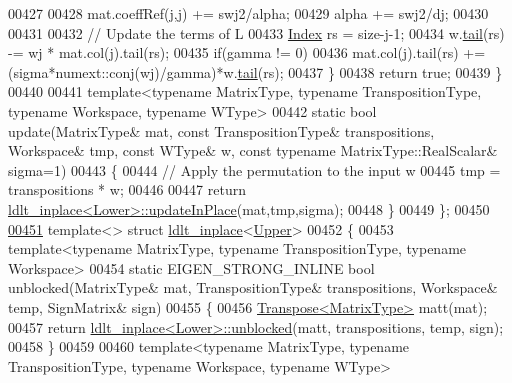\begin{DoxyCode}
00427 
00428       mat.coeffRef(j,j) += swj2/alpha;
00429       alpha += swj2/dj;
00430 
00431 
00432       \textcolor{comment}{// Update the terms of L}
00433       \hyperlink{namespace_eigen_a62e77e0933482dafde8fe197d9a2cfde}{Index} rs = size-j-1;
00434       w.\hyperlink{group___core___module_aec3cf8f4f73c641d21a2c080c3e59662}{tail}(rs) -= wj * mat.col(j).tail(rs);
00435       \textcolor{keywordflow}{if}(gamma != 0)
00436         mat.col(j).tail(rs) += (sigma*numext::conj(wj)/gamma)*w.\hyperlink{group___core___module_aec3cf8f4f73c641d21a2c080c3e59662}{tail}(rs);
00437     \}
00438     \textcolor{keywordflow}{return} \textcolor{keyword}{true};
00439   \}
00440 
00441   \textcolor{keyword}{template}<\textcolor{keyword}{typename} MatrixType, \textcolor{keyword}{typename} TranspositionType, \textcolor{keyword}{typename} Workspace, \textcolor{keyword}{typename} WType>
00442   \textcolor{keyword}{static} \textcolor{keywordtype}{bool} update(MatrixType& mat, \textcolor{keyword}{const} TranspositionType& transpositions, Workspace& tmp, \textcolor{keyword}{const} WType&
       w, \textcolor{keyword}{const} \textcolor{keyword}{typename} MatrixType::RealScalar& sigma=1)
00443   \{
00444     \textcolor{comment}{// Apply the permutation to the input w}
00445     tmp = transpositions * w;
00446 
00447     \textcolor{keywordflow}{return} \hyperlink{struct_eigen_1_1internal_1_1ldlt__inplace}{ldlt\_inplace<Lower>::updateInPlace}(mat,tmp,sigma);
00448   \}
00449 \};
00450 
\hyperlink{struct_eigen_1_1internal_1_1ldlt__inplace_3_01_upper_01_4}{00451} \textcolor{keyword}{template}<> \textcolor{keyword}{struct }\hyperlink{struct_eigen_1_1internal_1_1ldlt__inplace}{ldlt\_inplace}<\hyperlink{group__enums_gga39e3366ff5554d731e7dc8bb642f83cda6bcb58be3b8b8ec84859ce0c5ac0aaec}{Upper}>
00452 \{
00453   \textcolor{keyword}{template}<\textcolor{keyword}{typename} MatrixType, \textcolor{keyword}{typename} TranspositionType, \textcolor{keyword}{typename} Workspace>
00454   \textcolor{keyword}{static} EIGEN\_STRONG\_INLINE \textcolor{keywordtype}{bool} unblocked(MatrixType& mat, TranspositionType& transpositions, Workspace& 
      temp, SignMatrix& sign)
00455   \{
00456     \hyperlink{group___core___module_class_eigen_1_1_transpose}{Transpose<MatrixType>} matt(mat);
00457     \textcolor{keywordflow}{return} \hyperlink{struct_eigen_1_1internal_1_1ldlt__inplace}{ldlt\_inplace<Lower>::unblocked}(matt, transpositions, temp, sign);
00458   \}
00459 
00460   \textcolor{keyword}{template}<\textcolor{keyword}{typename} MatrixType, \textcolor{keyword}{typename} TranspositionType, \textcolor{keyword}{typename} Workspace, \textcolor{keyword}{typename} WType>

\end{DoxyCode}
